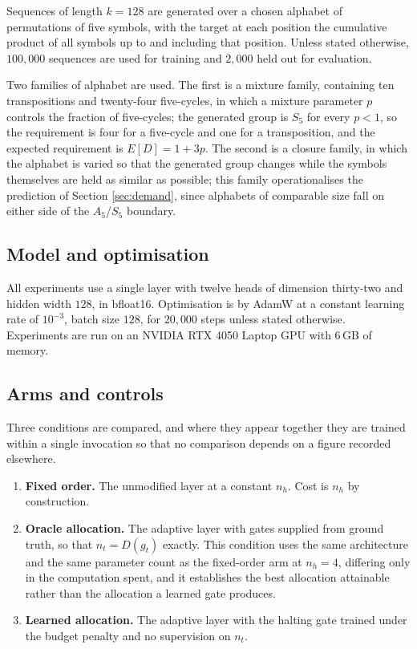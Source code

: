 Sequences of length $k = 128$ are generated over a chosen alphabet of
permutations of five symbols, with the target at each position the cumulative
product of all symbols up to and including that position. Unless stated
otherwise, $100{,}000$ sequences are used for training and $2{,}000$ held out for
evaluation.

Two families of alphabet are used. The first is a mixture family, containing ten
transpositions and twenty-four five-cycles, in which a mixture parameter $p$
controls the fraction of five-cycles; the generated group is $S_5$ for every
$p < 1$, so the requirement is four for a five-cycle and one for a transposition,
and the expected requirement is $E[D] = 1 + 3p$. The second is a closure family,
in which the alphabet is varied so that the generated group changes while the
symbols themselves are held as similar as possible; this family operationalises
the prediction of Section \ref{sec:demand}, since alphabets of comparable size
fall on either side of the $A_5$/$S_5$ boundary.

\subsection{Model and optimisation}

All experiments use a single layer with twelve heads of dimension thirty-two and
hidden width $128$, in bfloat16. Optimisation is by AdamW at a constant learning
rate of $10^{-3}$, batch size $128$, for $20{,}000$ steps unless stated
otherwise. Experiments are run on an NVIDIA RTX 4050 Laptop GPU with 6\,GB of
memory.

\subsection{Arms and controls}

Three conditions are compared, and where they appear together they are trained
within a single invocation so that no comparison depends on a figure recorded
elsewhere.

\begin{enumerate}[label={(\arabic*)}]
	\item \textbf{Fixed order.} The unmodified layer at a constant $n_h$. Cost is
	$n_h$ by construction.
	\item \textbf{Oracle allocation.} The adaptive layer with gates supplied from
	ground truth, so that $n_t = D(g_t)$ exactly. This condition uses the same
	architecture and the same parameter count as the fixed-order arm at
	$n_h = 4$, differing only in the computation spent, and it establishes the
	best allocation attainable rather than the allocation a learned gate produces.
	\item \textbf{Learned allocation.} The adaptive layer with the halting gate
	trained under the budget penalty and no supervision on $n_t$.
\end{enumerate}

